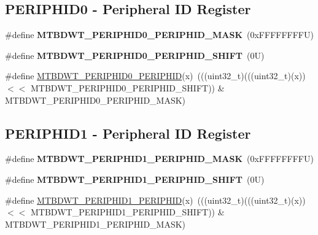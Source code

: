 \subsection*{P\+E\+R\+I\+P\+H\+I\+D0 -\/ Peripheral ID Register}
\begin{DoxyCompactItemize}
\item 
\mbox{\label{group___m_t_b___register___masks_ga72e68ff35b7952164566609bcfda90cd}} 
\#define {\bfseries M\+T\+B\+D\+W\+T\+\_\+\+P\+E\+R\+I\+P\+H\+I\+D0\+\_\+\+P\+E\+R\+I\+P\+H\+I\+D\+\_\+\+M\+A\+SK}~(0x\+F\+F\+F\+F\+F\+F\+F\+F\+U)
\item 
\mbox{\label{group___m_t_b___register___masks_ga0414df0247532ec3d97e2a15f2ab5419}} 
\#define {\bfseries M\+T\+B\+D\+W\+T\+\_\+\+P\+E\+R\+I\+P\+H\+I\+D0\+\_\+\+P\+E\+R\+I\+P\+H\+I\+D\+\_\+\+S\+H\+I\+FT}~(0\+U)
\item 
\#define \mbox{\hyperlink{group___m_t_b___register___masks_gae7cd120235fd7c30a2943dfac6f49015}{M\+T\+B\+D\+W\+T\+\_\+\+P\+E\+R\+I\+P\+H\+I\+D0\+\_\+\+P\+E\+R\+I\+P\+H\+ID}}(x)~(((uint32\+\_\+t)(((uint32\+\_\+t)(x)) $<$$<$ M\+T\+B\+D\+W\+T\+\_\+\+P\+E\+R\+I\+P\+H\+I\+D0\+\_\+\+P\+E\+R\+I\+P\+H\+I\+D\+\_\+\+S\+H\+I\+FT)) \& M\+T\+B\+D\+W\+T\+\_\+\+P\+E\+R\+I\+P\+H\+I\+D0\+\_\+\+P\+E\+R\+I\+P\+H\+I\+D\+\_\+\+M\+A\+SK)
\end{DoxyCompactItemize}
\subsection*{P\+E\+R\+I\+P\+H\+I\+D1 -\/ Peripheral ID Register}
\begin{DoxyCompactItemize}
\item 
\mbox{\label{group___m_t_b___register___masks_ga454b3b5f6fdf0afabb5ecf9bad14867a}} 
\#define {\bfseries M\+T\+B\+D\+W\+T\+\_\+\+P\+E\+R\+I\+P\+H\+I\+D1\+\_\+\+P\+E\+R\+I\+P\+H\+I\+D\+\_\+\+M\+A\+SK}~(0x\+F\+F\+F\+F\+F\+F\+F\+F\+U)
\item 
\mbox{\label{group___m_t_b___register___masks_ga5672cddf7ccbf00edee735d65ba9ed4b}} 
\#define {\bfseries M\+T\+B\+D\+W\+T\+\_\+\+P\+E\+R\+I\+P\+H\+I\+D1\+\_\+\+P\+E\+R\+I\+P\+H\+I\+D\+\_\+\+S\+H\+I\+FT}~(0\+U)
\item 
\#define \mbox{\hyperlink{group___m_t_b___register___masks_ga783ced663f97019caa15b6f270697d13}{M\+T\+B\+D\+W\+T\+\_\+\+P\+E\+R\+I\+P\+H\+I\+D1\+\_\+\+P\+E\+R\+I\+P\+H\+ID}}(x)~(((uint32\+\_\+t)(((uint32\+\_\+t)(x)) $<$$<$ M\+T\+B\+D\+W\+T\+\_\+\+P\+E\+R\+I\+P\+H\+I\+D1\+\_\+\+P\+E\+R\+I\+P\+H\+I\+D\+\_\+\+S\+H\+I\+FT)) \& M\+T\+B\+D\+W\+T\+\_\+\+P\+E\+R\+I\+P\+H\+I\+D1\+\_\+\+P\+E\+R\+I\+P\+H\+I\+D\+\_\+\+M\+A\+SK)
\end{DoxyCompactItemize}
